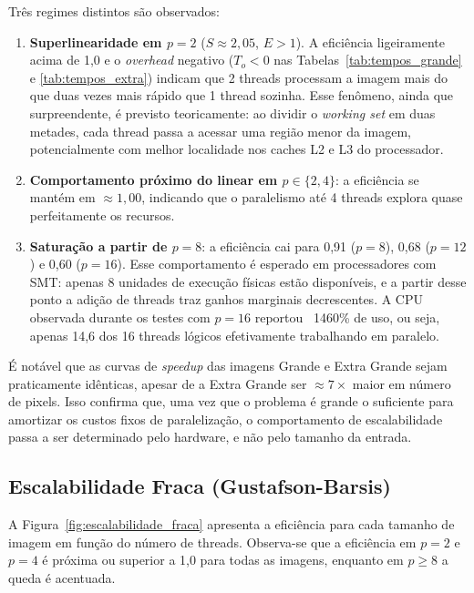 \documentclass[12pt]{article}
\begin{document}
Três regimes distintos são observados:

\begin{enumerate}
	\item \textbf{Superlinearidade em $p = 2$} ($S \approx 2{,}05$, $E > 1$).
	      A eficiência ligeiramente acima de 1,0 e o \textit{overhead} negativo
	      ($T_o < 0$ nas Tabelas~\ref{tab:tempos_grande} e \ref{tab:tempos_extra})
	      indicam que 2 threads processam a imagem mais do que duas vezes mais rápido
	      que 1 thread sozinha. Esse fenômeno, ainda que surpreendente, é previsto
	      teoricamente: ao dividir o \textit{working set} em duas metades, cada thread
	      passa a acessar uma região menor da imagem, potencialmente com melhor
	      localidade nos caches L2 e L3 do processador.

	\item \textbf{Comportamento próximo do linear em $p \in \{2, 4\}$}: a
	      eficiência se mantém em $\approx 1{,}00$, indicando que o paralelismo
	      até 4 threads explora quase perfeitamente os recursos.

	\item \textbf{Saturação a partir de $p = 8$}: a eficiência cai para 0,91
	      ($p=8$), 0,68 ($p=12$) e 0,60 ($p=16$). Esse comportamento é esperado em
	      processadores com SMT: apenas 8 unidades de execução físicas estão
	      disponíveis, e a partir desse ponto a adição de threads traz ganhos
	      marginais decrescentes. A CPU observada durante os testes com $p=16$
	      reportou ~1460\% de uso, ou seja, apenas 14,6 dos 16 threads lógicos
	      efetivamente trabalhando em paralelo.
\end{enumerate}

É notável que as curvas de \textit{speedup} das imagens Grande e Extra Grande
sejam praticamente idênticas, apesar de a Extra Grande ser $\approx 7\times$
maior em número de pixels. Isso confirma que, uma vez que o problema é grande
o suficiente para amortizar os custos fixos de paralelização, o
comportamento de escalabilidade passa a ser determinado pelo hardware, e não
pelo tamanho da entrada.

\subsection{Escalabilidade Fraca (Gustafson-Barsis)}

A Figura~\ref{fig:escalabilidade_fraca} apresenta a eficiência para cada
tamanho de imagem em função do número de threads. Observa-se que a eficiência
em $p = 2$ e $p = 4$ é próxima ou superior a 1,0 para todas as imagens,
enquanto em $p \geq 8$ a queda é acentuada.
\end{document}
